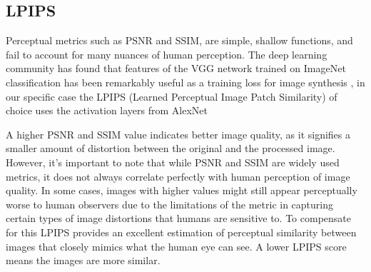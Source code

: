 \subsection{LPIPS}
\label{subsec:LPIPS}
  Perceptual metrics such as PSNR and SSIM, are simple, shallow functions, and fail to account for many nuances of human perception. The deep learning community has found that features
  of the VGG network trained on ImageNet classification has
  been remarkably useful as a training loss for image synthesis \cite{zhang2018unreasonable}, in our specific case the LPIPS (Learned Perceptual Image Patch Similarity) of choice uses the activation layers from AlexNet \cite{NIPS2012_c399862d}


A higher PSNR and SSIM value indicates better image quality, as it signifies a smaller amount of distortion between the original and the processed image. However, it's important to note that while PSNR and SSIM are widely used metrics, it does not always correlate perfectly with human perception of image quality. In some cases, images with higher values might still appear perceptually worse to human observers due to the limitations of the metric in capturing certain types of image distortions that humans are sensitive to. To compensate for this LPIPS provides an excellent estimation of perceptual similarity between images that closely mimics what the human eye can see. A lower LPIPS score means the images are more similar.
